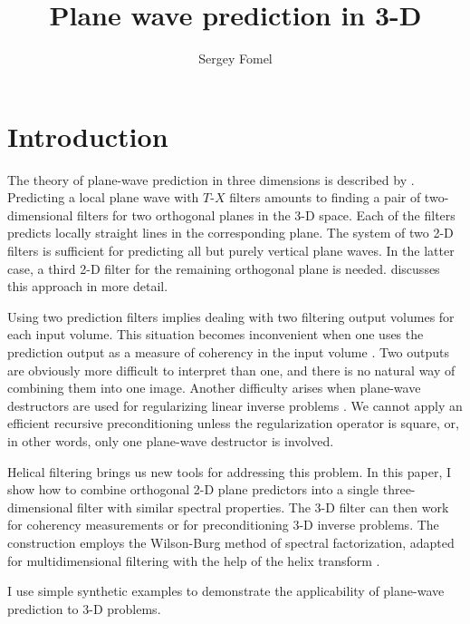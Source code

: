 
\title{Plane wave prediction in 3-D}


\author{Sergey Fomel}

\maketitle

\section{Introduction}

The theory of plane-wave prediction in three dimensions is described
by \cite{Claerbout.sep.77.19,gee}. Predicting a local plane wave with
$T$-$X$ filters amounts to finding a pair of two-dimensional filters
for two orthogonal planes in the 3-D space.  Each of the filters
predicts locally straight lines in the corresponding plane. The system
of two 2-D filters is sufficient for predicting all but purely
vertical plane waves. In the latter case, a third 2-D filter for the
remaining orthogonal plane is needed.  \cite{Schwab.sepphd.99}
discusses this approach in more detail.
\par
Using two prediction filters implies dealing with two filtering output
volumes for each input volume. This situation becomes inconvenient
when one
uses the prediction output as a measure of coherency in the input
volume \cite[]{Claerbout.sep.77.19,Schwab.sep.92.29}. Two outputs are
obviously more difficult to interpret than one, and there is no
natural way of combining them into one image. Another difficulty
arises when plane-wave destructors are used for regularizing linear
inverse problems \cite[]{Clapp.sep.95.bob1}. We cannot
apply an efficient recursive preconditioning
\cite[]{Claerbout.sep.97.jon2} unless the regularization operator is
square, or, in other words, only one plane-wave destructor is involved.
\par
Helical filtering \cite[]{GEO63-05-15321541} brings us new tools for
addressing this problem. In this paper, I show how to combine
orthogonal 2-D plane predictors into a single three-dimensional filter
with similar spectral properties. The 3-D filter can then work for
coherency measurements or for preconditioning 3-D inverse problems.
The construction employs the Wilson-Burg method of spectral
factorization, adapted for multidimensional filtering with the help of
the helix transform \cite[]{Sava.sep.97.paul1}.
\par
I use simple synthetic examples to demonstrate the applicability of 
plane-wave prediction to 3-D problems.

